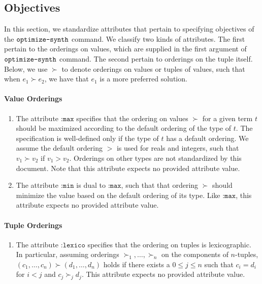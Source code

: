 \documentclass[english,a4paper,10pt]{article}
\begin{document}
\subsection{Objectives}%
\label{sec:attr-objectives}

In this section, we standardize attributes that pertain to specifying objectives of the $\texttt{optimize-synth}$ command.
We classify two kinds of attributes.
The first pertain to the orderings on values,
which are supplied in the first argument of $\texttt{optimize-synth}$ command.
The second pertain to orderings on the tuple itself.
Below, we use $\succ$ to denote orderings on values or tuples of values,
such that when $e_1 \succ e_2$, we have that $e_1$ is a more preferred solution.

\paragraph{Value Orderings}
\begin{enumerate}
\item The attribute $\texttt{:max}$ specifies that the ordering on values 
$\succ$ for a given term $t$ should be maximized according to the default ordering
of the type of $t$.
The specification is well-defined only if the type of $t$ has a default ordering.
We assume the default ordering $>$ is used for reals and integers, such that
$v_1 \succ v_2$ if $v_1 > v_2$.
Orderings on other types are not standardized by this document.
Note that this attribute expects no provided attribute value.
\item The attribute $\texttt{:min}$ is dual to $\texttt{:max}$, such that that ordering $\succ$
should minimize the value based on the default ordering of its type.
Like $\texttt{:max}$, this attribute expects no provided attribute value.
\end{enumerate}

\paragraph{Tuple Orderings}

\begin{enumerate}
\item The attribute $\texttt{:lexico}$ specifies that the ordering on tuples is lexicographic.
In particular, assuming orderings $\succ_1, \ldots, \succ_n$ on the components of $n$-tuples,
$(c_1, \ldots, c_n) \succ (d_1, \ldots, d_n)$ holds if there exists a $0 \leq j \leq n$
such that $c_i = d_i$ for $i<j$ and $c_j \succ_j d_j$.
This attribute expects no provided attribute value.
\end{enumerate}
\end{document}
